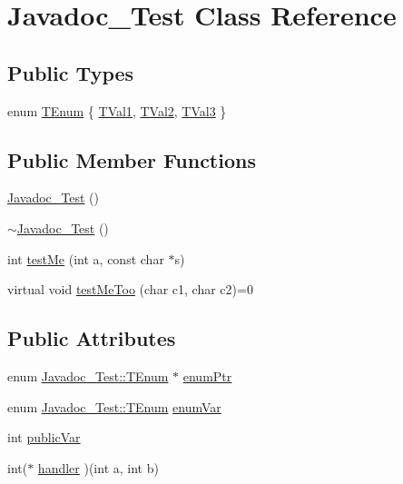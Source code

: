 \hypertarget{class_javadoc___test}{}\section{Javadoc\+\_\+\+Test Class Reference}
\label{class_javadoc___test}
\subsection*{Public Types}
\begin{DoxyCompactItemize}
\item 
enum \mbox{\hyperlink{class_javadoc___test_ae37fd1cbf1af522674cbd33873b786a6}{T\+Enum}} \{ \mbox{\hyperlink{class_javadoc___test_ae37fd1cbf1af522674cbd33873b786a6a90f0d8d4f07a79342261fb1c191af72b}{T\+Val1}}, 
\mbox{\hyperlink{class_javadoc___test_ae37fd1cbf1af522674cbd33873b786a6a5954e696a652f442d7255af4e0d35d61}{T\+Val2}}, 
\mbox{\hyperlink{class_javadoc___test_ae37fd1cbf1af522674cbd33873b786a6ab4a4dc16e1050c9604cf5c46a51e5a8e}{T\+Val3}}
 \}
\end{DoxyCompactItemize}
\subsection*{Public Member Functions}
\begin{DoxyCompactItemize}
\item 
\mbox{\hyperlink{class_javadoc___test_a17313327932ae97596b0a455ba8342cc}{Javadoc\+\_\+\+Test}} ()
\item 
\mbox{\hyperlink{class_javadoc___test_a60016cd15a4ed82bbc35be79a0a6a6b5}{$\sim$\+Javadoc\+\_\+\+Test}} ()
\item 
int \mbox{\hyperlink{class_javadoc___test_a0c472683ed25ff096e8a9edfb18d550c}{test\+Me}} (int a, const char $\ast$s)
\item 
virtual void \mbox{\hyperlink{class_javadoc___test_ac2b39cabbe80957ae3e8bc2bd4e887f6}{test\+Me\+Too}} (char c1, char c2)=0
\end{DoxyCompactItemize}
\subsection*{Public Attributes}
\begin{DoxyCompactItemize}
\item 
enum \mbox{\hyperlink{class_javadoc___test_ae37fd1cbf1af522674cbd33873b786a6}{Javadoc\+\_\+\+Test\+::\+T\+Enum}} $\ast$ \mbox{\hyperlink{class_javadoc___test_abcb36df9d8af3e69290c239ba483d6df}{enum\+Ptr}}
\item 
enum \mbox{\hyperlink{class_javadoc___test_ae37fd1cbf1af522674cbd33873b786a6}{Javadoc\+\_\+\+Test\+::\+T\+Enum}} \mbox{\hyperlink{class_javadoc___test_a689558649150237b53a5c8ed89c996c2}{enum\+Var}}
\item 
int \mbox{\hyperlink{class_javadoc___test_a44a516fbc3a4865e2dcae34649c9df6a}{public\+Var}}
\item 
int($\ast$ \mbox{\hyperlink{class_javadoc___test_ace81a523a4eef44501a841a6d338832b}{handler}} )(int a, int b)
\end{DoxyCompactItemize}


